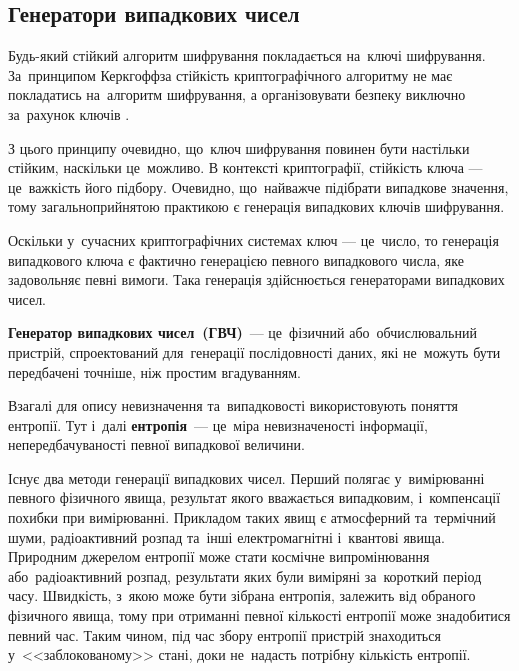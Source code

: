 \documentclass[a4paper,oneside,titlepage,14pt]{extarticle}
\begin{document}
		\subsection{Генератори випадкових чисел}
			Будь-який стійкий алгоритм шифрування покладається на~ключі шифрування. За~принципом Керкгоффза стійкість криптографічного алгоритму не має покладатись на~алгоритм шифрування, а організовувати безпеку виключно за~рахунок ключів \cite{kerckhoffs1883cryptographie}.\par
			З цього принципу очевидно, що~ключ шифрування повинен бути настільки стійким, наскільки це~можливо. В контексті криптографії, стійкість ключа --- це~важкість його підбору. Очевидно, що~найважче підібрати випадкове значення, тому загальноприйнятою практикою є генерація випадкових ключів шифрування.\par
			Оскільки у~сучасних криптографічних системах ключ --- це~число, то генерація випадкового ключа є фактично генерацією певного випадкового числа, яке задовольняє певні вимоги. Така генерація здійснюється генераторами випадкових чисел.\par
			\textbf{Генератор випадкових чисел~(ГВЧ)}~--- це~фізичний або~обчислювальний пристрій, спроектований для~генерації послідовності даних, які не~можуть бути передбачені точніше, ніж простим вгадуванням.\par
			Взагалі для опису невизначення та~випадковості використовують поняття ентропії. Тут і~далі \textbf{ентропія}~--- це~міра невизначеності інформації, непередбачуваності певної випадкової величини.\par
			Існує два методи генерації випадкових чисел. Перший полягає у~вимірюванні певного фізичного явища, результат якого вважається випадковим, і~компенсації похибки при вимірюванні. Прикладом таких явищ є атмосферний та~термічний шуми, радіоактивний розпад та~інші електромагнітні і~квантові явища. Природним джерелом ентропії може стати космічне випромінювання або~радіоактивний розпад, результати яких були виміряні за~короткий період часу. Швидкість, з~якою може бути зібрана ентропія, залежить від обраного фізичного явища, тому при отриманні певної кількості ентропії може знадобитися певний час. Таким чином, під час збору ентропії пристрій знаходиться у~<<заблокованому>> стані, доки не~надасть потрібну кількість ентропії.\par
\end{document}
